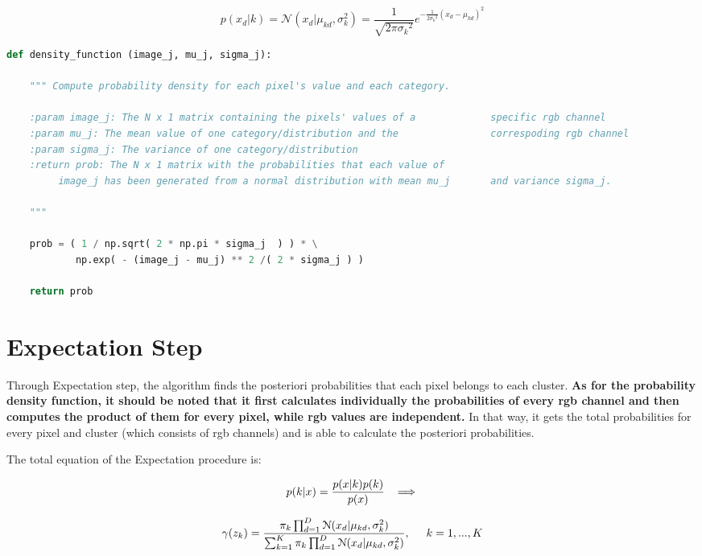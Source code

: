\documentclass[11pt]{article}
\begin{document}
$$
{p(x_d|k)}= \mathcal{N} (x_d|\mu_{kd}, \sigma_{k}^2) = \frac{1}{\sqrt{2\pi{\sigma_{k}}^2}}e^{-\frac{1}{2{\sigma_{k}}^2}{(x_d-\mu_{kd})}^2}$$

\begin{lstlisting}[language = Python]
def density_function (image_j, mu_j, sigma_j):
    
    """ Compute probability density for each pixel's value and each category.
    
    :param image_j: The N x 1 matrix containing the pixels' values of a             specific rgb channel
    :param mu_j: The mean value of one category/distribution and the                correspoding rgb channel
    :param sigma_j: The variance of one category/distribution
    :return prob: The N x 1 matrix with the probabilities that each value of 
         image_j has been generated from a normal distribution with mean mu_j       and variance sigma_j.
        
    """
    
    prob = ( 1 / np.sqrt( 2 * np.pi * sigma_j  ) ) * \
            np.exp( - (image_j - mu_j) ** 2 /( 2 * sigma_j ) )

    return prob
\end{lstlisting}
\newpage
\section{Expectation Step}

Through Expectation step, the algorithm finds the posteriori probabilities that each pixel belongs to each cluster.\textbf{ As for the probability density function, it should be noted that it first calculates individually the probabilities of every rgb channel and then computes the product of them for every pixel, while rgb values are independent.} In that way, it gets the total probabilities for every pixel and cluster (which consists of rgb channels) and is able to calculate the posteriori probabilities. 
\newline

\noindent The total equation of the Expectation procedure is:

$$
p(k|x) =\frac{ p(x|k) p(k)}{p(x)} \hspace{0.3cm} \Longrightarrow \\
$$

$$
\gamma{(z_k)} = \frac{\pi_{k} \prod_{d=1}^{D} \mathcal{N} (x_{d}|\mu_{kd}, \sigma_{k}^2)} {\sum_{k=1}^{K} \pi_k \prod_{d=1}^{D} \mathcal{N} (x_{d}|\mu_{kd}, \sigma_{k}^2)},  \hspace{5mm} k=1,...,K
$$
\newline 
\end{document}
